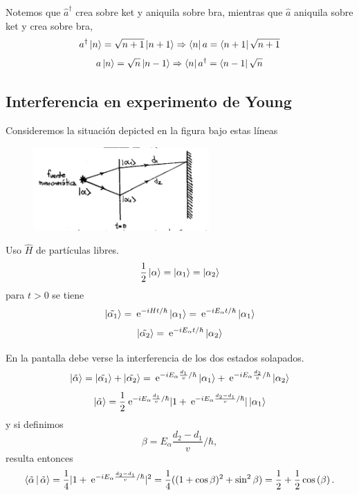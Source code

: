 \documentclass[10pt,oneside]{CBFT_book}
\begin{document}
Notemos que $\hat{a}^\dagger$ crea sobre ket y aniquila sobre bra, mientras que $\hat{a}$ aniquila sobre ket 
y 
crea 
sobre bra,
\[
	a^\dagger \Ket{n} = \sqrt{n+1} \Ket{n+1} \Rightarrow \Bra{n} a = \Bra{n+1} \sqrt{n+1}
\]
\[
	a \Ket{n} = \sqrt{n} \Ket{n-1} \Rightarrow \Bra{n} a^\dagger = \Bra{n-1} \sqrt{n}
\]

\subsection{Interferencia en experimento de Young}

Consideremos la situación depicted en la figura bajo estas líneas

\begin{figure}[htb]
	\begin{center}
	\includegraphics[width=0.6\textwidth]{images/teo2_6.pdf}	 
	\end{center}
	\caption{}
\end{figure} 

Uso $\hat{H}$ de partículas libres.
\[
	\frac{1}{2} \Ket{\alpha} = \Ket{\alpha_1} = \Ket{\alpha_2}
\]
para $t>0$ se tiene 
\[
	\Ket{\tilde{\alpha_1}} = \:\mathrm{e}^{ -i H t /\hbar } \Ket{\alpha_1} =
		\:\mathrm{e}^{ -i E_\alpha t /\hbar } \Ket{\alpha_1}	
\]
\[
	\Ket{\tilde{\alpha_2}} = \:\mathrm{e}^{ -i E_\alpha t /\hbar } \Ket{\alpha_2}	
\]

En la pantalla debe verse la interferencia de los dos estados solapados.
\[
	\Ket{\tilde{\alpha}} = \Ket{\tilde{\alpha_1}} + \Ket{\tilde{\alpha_2}} =
		\:\mathrm{e}^{ -i E_\alpha \frac{d_1}{v} /\hbar } \Ket{\alpha_1} +
		\:\mathrm{e}^{ -i E_\alpha \frac{d_2}{v} /\hbar } \Ket{\alpha_2}	
\]
\[
	\Ket{\tilde{\alpha}} = \frac{1}{2} \:\mathrm{e}^{ -i E_\alpha \frac{d_1}{v} /\hbar } 
		| 1 + \:\mathrm{e}^{ -i E_\alpha \frac{d_2-d_1}{v} /\hbar } | \Ket{\alpha_1}
\]
y si definimos
\[
	\beta=E_\alpha \frac{d_2-d_1}{v} /\hbar,
\]
resulta entonces
\[
	\Braket{\tilde{\alpha}|\tilde{\alpha}} = \frac{1}{4}| 1 +  \:\mathrm{e}^{ -i E_\alpha \frac{d_2-d_1}{v} 
/\hbar } |^2 =
		\frac{1}{4}( (1+\cos\beta)^2 + \sin^2\beta ) =
			\frac{1}{2} + \frac{1}{2}\cos\left( \beta \right).
\]
\end{document}
